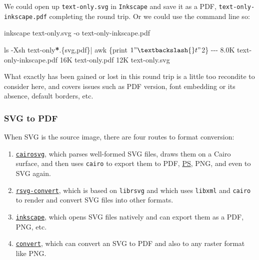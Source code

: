 \documentclass[
  12pt,
  british,
  a4paper,
  rgb,
  dvipsnames,
  svgnames,
  hyphens]{article}
\newenvironment{Shaded}{\begin{snugshade}}{\end{snugshade}}
\newcommand{\AttributeTok}[1]{\textcolor[rgb]{0.80,0.80,0.80}{#1}}
\newcommand{\DataTypeTok}[1]{\textcolor[rgb]{0.87,0.87,0.75}{#1}}
\newcommand{\ExtensionTok}[1]{\textcolor[rgb]{0.80,0.80,0.80}{#1}}
\newcommand{\FunctionTok}[1]{\textcolor[rgb]{0.94,0.94,0.56}{#1}}
\newcommand{\KeywordTok}[1]{\textcolor[rgb]{0.94,0.87,0.69}{#1}}
\newcommand{\NormalTok}[1]{\textcolor[rgb]{0.80,0.80,0.80}{#1}}
\newcommand{\OperatorTok}[1]{\textcolor[rgb]{0.94,0.94,0.82}{#1}}
\newcommand{\PreprocessorTok}[1]{\textcolor[rgb]{1.00,0.81,0.69}{\textbf{#1}}}
\newcommand{\StringTok}[1]{\textcolor[rgb]{0.80,0.58,0.58}{#1}}
\begin{document}
We could open up \texttt{text-only.svg} in \texttt{Inkscape} and save it
as a PDF, \texttt{text-only-inkscape.pdf} completing the round trip. Or
we could use the command line so:

\begin{Shaded}
\begin{Highlighting}[]
\ExtensionTok{inkscape}\NormalTok{ text{-}only.svg }\AttributeTok{{-}o}\NormalTok{ text{-}only{-}inkscape.pdf}

\FunctionTok{ls} \AttributeTok{{-}Xsh}\NormalTok{ text{-}only}\PreprocessorTok{*}\NormalTok{.}\DataTypeTok{\{svg}\OperatorTok{,}\DataTypeTok{pdf\}}\KeywordTok{|} \FunctionTok{awk} \StringTok{\textquotesingle{}\{print $1 "\textbackslash{}t" $2\}\textquotesingle{}}
\ExtensionTok{{-}{-}{-}}
\ExtensionTok{8.0K}\NormalTok{    text{-}only{-}inkscape.pdf}
\ExtensionTok{16K}\NormalTok{     text{-}only.pdf}
\ExtensionTok{12K}\NormalTok{     text{-}only.svg}
\end{Highlighting}
\end{Shaded}

What exactly has been gained or lost in this round trip is a little too
recondite to consider here, and covers issues such as PDF version, font
embedding or its absence, default borders, etc.

\hypertarget{svg-to-pdf}{%
\subsubsection{SVG to PDF}\label{svg-to-pdf}}

When SVG is the source image, there are four routes to format
conversion:

\begin{enumerate}
\item
  \href{https://cairosvg.org/}{\texttt{cairosvg}}, which parses
  well-formed SVG files, draws them on a Cairo surface, and then uses
  \texttt{cairo} to export them to PDF,
  \href{https://techterms.com/definition/postscript}{PS}, PNG, and even
  to SVG again.
\item
  \href{https://en.wikipedia.org/wiki/Librsvg}{\texttt{rsvg-convert}},
  which is based on \texttt{librsvg} and which uses \texttt{libxml} and
  \texttt{cairo} to render and convert SVG files into other formats.
\item
  \href{https://inkscape.org/}{\texttt{inkscape}}, which opens SVG files
  natively and can export them as a PDF, PNG, etc.
\item
  \href{https://imagemagick.org/script/convert.php}{\texttt{convert}},
  which can convert an SVG to PDF and also to any raster format like
  PNG.
\end{enumerate}
\end{document}
